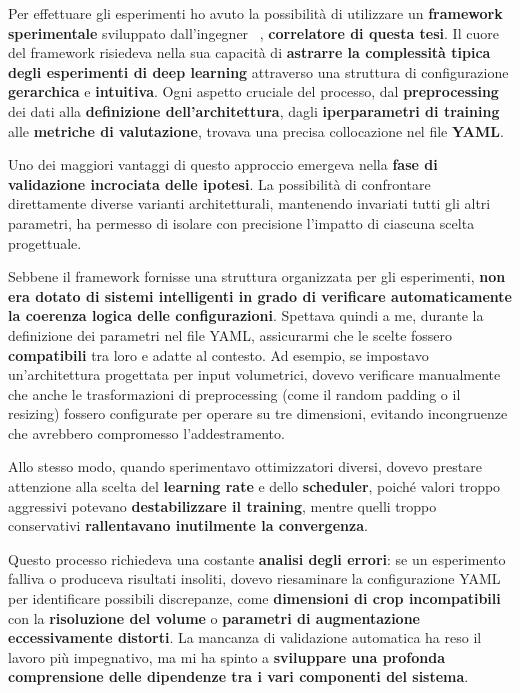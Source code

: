 
Per effettuare gli esperimenti ho avuto la possibilità di utilizzare un \textbf{framework sperimentale} sviluppato dall'ingegner  ~\cite{MarcoCantone}, \textbf{correlatore di questa tesi}. Il cuore del framework risiedeva nella sua capacità di \textbf{astrarre la complessità tipica degli esperimenti di deep learning} attraverso una struttura di configurazione \textbf{gerarchica} e \textbf{intuitiva}. Ogni aspetto cruciale del processo, dal \textbf{preprocessing} dei dati alla \textbf{definizione dell'architettura}, dagli \textbf{iperparametri di training} alle \textbf{metriche di valutazione}, trovava una precisa collocazione nel file \textbf{YAML}.

Uno dei maggiori vantaggi di questo approccio emergeva nella \textbf{fase di validazione incrociata delle ipotesi}. La possibilità di confrontare direttamente diverse varianti architetturali, mantenendo invariati tutti gli altri parametri, ha permesso di isolare con precisione l'impatto di ciascuna scelta progettuale.


Sebbene il framework fornisse una struttura organizzata per gli esperimenti, \textbf{non era dotato di sistemi intelligenti in grado di verificare automaticamente la coerenza logica delle configurazioni}. Spettava quindi a me, durante la definizione dei parametri nel file YAML, assicurarmi che le scelte fossero \textbf{compatibili} tra loro e adatte al contesto. Ad esempio, se impostavo un'architettura progettata per input volumetrici, dovevo verificare manualmente che anche le trasformazioni di preprocessing (come il random padding o il resizing) fossero configurate per operare su tre dimensioni, evitando incongruenze che avrebbero compromesso l'addestramento. 


Allo stesso modo, quando sperimentavo ottimizzatori diversi, dovevo prestare attenzione alla scelta del \textbf{learning rate} e dello \textbf{scheduler}, poiché valori troppo aggressivi potevano \textbf{destabilizzare il training}, mentre quelli troppo conservativi \textbf{rallentavano inutilmente la convergenza}. 

Questo processo richiedeva una costante \textbf{analisi degli errori}: se un esperimento falliva o produceva risultati insoliti, dovevo riesaminare la configurazione YAML per identificare possibili discrepanze, come \textbf{dimensioni di crop incompatibili} con la \textbf{risoluzione del volume} o \textbf{parametri di augmentazione eccessivamente distorti}. La mancanza di validazione automatica ha reso il lavoro più impegnativo, ma mi ha spinto a \textbf{sviluppare una profonda comprensione delle dipendenze tra i vari componenti del sistema}.


